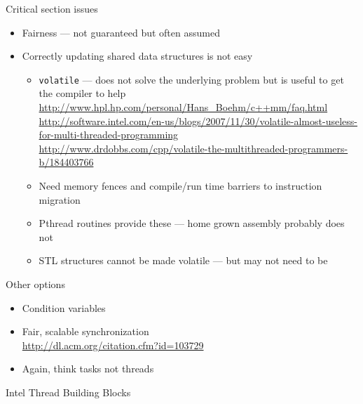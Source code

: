 \begin{frame}[fragile]{Critical section issues}
  \begin{itemize}
  \item Fairness --- not guaranteed but often assumed
  \item Correctly updating shared data structures is not easy
    \begin{itemize}
    \item \verb+volatile+ --- does not solve the underlying problem but is useful to get the compiler to help \\
{\tiny \url{http://www.hpl.hp.com/personal/Hans_Boehm/c++mm/faq.html}}\\
{\tiny \url{http://software.intel.com/en-us/blogs/2007/11/30/volatile-almost-useless-for-multi-threaded-programming}}\\
{\tiny \url{http://www.drdobbs.com/cpp/volatile-the-multithreaded-programmers-b/184403766}}
    \item Need memory fences and compile/run time barriers to instruction migration
    \item Pthread routines provide these --- home grown assembly probably does not
    \item STL structures cannot be made volatile --- but may not need to be
    \end{itemize}
  \end{itemize}
\end{frame}


\begin{frame}{Other options}
  \begin{itemize}
  \item Condition variables
  \item Fair, scalable synchronization\\
\url{http://dl.acm.org/citation.cfm?id=103729}
  \item Again, think tasks not threads
  \end{itemize}
\end{frame}

\begin{frame}{Intel Thread Building Blocks}


  
\end{frame}
 
